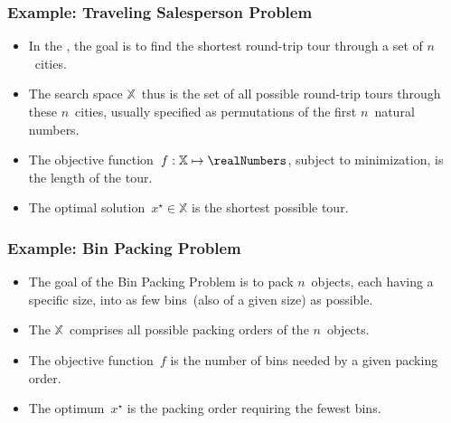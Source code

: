 \documentclass[aspectratio=169,mathserif,notheorems]{beamer}%
\gdef\searchSpace{\ensuremath{\mathbb{X}}}%
\gdef\sespel{\ensuremath{x}}%
\gdef\opti#1{\ensuremath{#1^{\star}}}%
\begin{document}
\begin{frame}%
\frametitle{Example: Traveling Salesperson Problem}%
\parbox{0.373\paperwidth}{%
\begin{itemize}%
%
\item In the \cite{ABCC2006TTSPACS,LLRKS1985TTSPAGTOCO}, the goal is to find the shortest round-trip tour through a set of $n$~cities.%
%
\item<2-> The search space \searchSpace\ thus is the set of all possible round-trip tours through these $n$~cities, usually specified as permutations of the first $n$~natural numbers.%
%
\item<3-> The objective function~$f:\searchSpace\mapsto\realNumbers$, subject to minimization, is the length of the tour.%
%
\item<4-> The optimal solution~$\opti{\sespel}\in\searchSpace$ is the shortest possible tour.%
%
\end{itemize}%
}%
%
%
%
%
\end{frame}%
%
\begin{frame}[t]%
\frametitle{Example: Bin Packing Problem}%
\begin{itemize}%
\item The goal of the Bin Packing Problem is to pack $n$~objects, each having a specific size, into as few bins~(also of a given size) as possible\cite{ZLWvdBTW2024RLSOT2RBPPWIR,ZWvdBTLTW2024RLSFTDBPAANRFFFA}.%
\item<2-> The \searchSpace\ comprises all possible packing orders of the $n$~objects.%
\item<3-> The objective function~$f$ is the number of bins needed by a given packing order.%
\item<4-> The optimum~$\opti{\sespel}$ is the packing order requiring the fewest bins.%
\end{itemize}%
%
\end{frame}%
%
\end{document}
